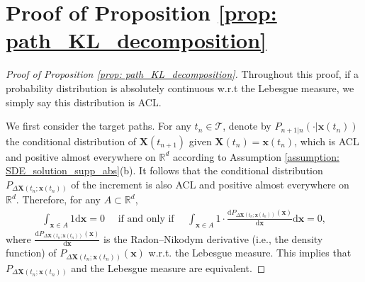 \documentclass[11pt]{article}
\newcommand{\mR}{\mathbb{R}}
\newcommand{\bX}{\mathbf{X}}
\newcommand{\bx}{\mathbf{x}}
\newcommand{\intd}{\mathrm{d}}
\begin{document}



\newpage
\appendix


 \section{Proof of Proposition \ref{prop: path_KL_decomposition}}\label{sec: path_KL_proof}


\begin{proof}[Proof of Proposition \ref{prop: path_KL_decomposition}]

Throughout this proof, if a probability distribution is absolutely continuous w.r.t the Lebesgue measure, we simply say this distribution is ACL.

We first consider the target paths. For any $t_n\in\mathcal{T}$, denote by $P_{n + 1| n}(\cdot | \bx(t_n))$ the conditional distribution of $\bX(t_{n + 1})$ given $\bX(t_n) = \bx(t_n)$, which is ACL and positive almost everywhere on $\mR^d$ according to Assumption \ref{assumption: SDE_solution_supp_abs}(b). It follows that the conditional distribution $P_{\Delta\bX(t_n; \bx(t_n))}$ of the increment is also ACL and positive almost everywhere on $\mR^d$.
Therefore, for any $A\subset \mR^d$,
\begin{align}\label{eq: equivalent_to_lebesgue}
    \int_{\bx\in A}1 \intd \bx = 0\quad  \text{ if and only if }\quad \int_{\bx \in A}1\cdot \frac{\intd P_{\Delta\bX(t_n; \bx(t_n))}(\bx)}{\intd \bx} \intd \bx= 0,
\end{align}
where $\frac{\intd P_{\Delta\bX(t_n; \bx(t_n))}(\bx)}{\intd \bx}$ is the Radon–Nikodym derivative (i.e., the density function) of $P_{\Delta\bX(t_n; \bx(t_n))}(\bx)$ w.r.t. the Lebesgue measure. This implies that $P_{\Delta\bX(t_n; \bx(t_n))}$ and the Lebesgue measure are equivalent.



\end{proof}
\end{document}
